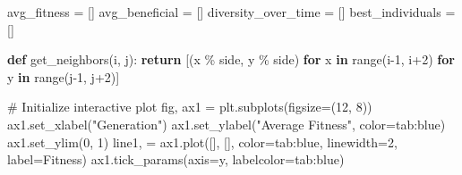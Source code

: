 \documentclass[
  letterpaper,
  DIV=11,
  numbers=noendperiod]{scrreprt}
\newenvironment{Shaded}{\begin{snugshade}}{\end{snugshade}}
\newcommand{\BuiltInTok}[1]{\textcolor[rgb]{0.00,0.23,0.31}{#1}}
\newcommand{\CommentTok}[1]{\textcolor[rgb]{0.37,0.37,0.37}{#1}}
\newcommand{\ControlFlowTok}[1]{\textcolor[rgb]{0.00,0.23,0.31}{\textbf{#1}}}
\newcommand{\DecValTok}[1]{\textcolor[rgb]{0.68,0.00,0.00}{#1}}
\newcommand{\KeywordTok}[1]{\textcolor[rgb]{0.00,0.23,0.31}{\textbf{#1}}}
\newcommand{\NormalTok}[1]{\textcolor[rgb]{0.00,0.23,0.31}{#1}}
\newcommand{\OperatorTok}[1]{\textcolor[rgb]{0.37,0.37,0.37}{#1}}
\newcommand{\StringTok}[1]{\textcolor[rgb]{0.13,0.47,0.30}{#1}}
\theoremstyle{definition}
\theoremstyle{remark}
\begin{document}
\begin{tcolorbox}
\begin{Shaded}
\begin{Highlighting}[]
\NormalTok{avg\_fitness }\OperatorTok{=}\NormalTok{ []}
\NormalTok{avg\_beneficial }\OperatorTok{=}\NormalTok{ []}
\NormalTok{diversity\_over\_time }\OperatorTok{=}\NormalTok{ []}
\NormalTok{best\_individuals }\OperatorTok{=}\NormalTok{ []}

\KeywordTok{def}\NormalTok{ get\_neighbors(i, j):}
    \ControlFlowTok{return}\NormalTok{ [(x }\OperatorTok{\%}\NormalTok{ side, y }\OperatorTok{\%}\NormalTok{ side)}
            \ControlFlowTok{for}\NormalTok{ x }\KeywordTok{in} \BuiltInTok{range}\NormalTok{(i}\OperatorTok{{-}}\DecValTok{1}\NormalTok{, i}\OperatorTok{+}\DecValTok{2}\NormalTok{)}
            \ControlFlowTok{for}\NormalTok{ y }\KeywordTok{in} \BuiltInTok{range}\NormalTok{(j}\OperatorTok{{-}}\DecValTok{1}\NormalTok{, j}\OperatorTok{+}\DecValTok{2}\NormalTok{)]}

\CommentTok{\# Initialize interactive plot}
\NormalTok{fig, ax1 }\OperatorTok{=}\NormalTok{ plt.subplots(figsize}\OperatorTok{=}\NormalTok{(}\DecValTok{12}\NormalTok{, }\DecValTok{8}\NormalTok{))}
\NormalTok{ax1.set\_xlabel(}\StringTok{"Generation"}\NormalTok{)}
\NormalTok{ax1.set\_ylabel(}\StringTok{"Average Fitness"}\NormalTok{, color}\OperatorTok{=}\StringTok{\textquotesingle{}tab:blue\textquotesingle{}}\NormalTok{)}
\NormalTok{ax1.set\_ylim(}\DecValTok{0}\NormalTok{, }\DecValTok{1}\NormalTok{)}
\NormalTok{line1, }\OperatorTok{=}\NormalTok{ ax1.plot([], [], color}\OperatorTok{=}\StringTok{\textquotesingle{}tab:blue\textquotesingle{}}\NormalTok{, linewidth}\OperatorTok{=}\DecValTok{2}\NormalTok{, label}\OperatorTok{=}\StringTok{\textquotesingle{}Fitness\textquotesingle{}}\NormalTok{)}
\NormalTok{ax1.tick\_params(axis}\OperatorTok{=}\StringTok{\textquotesingle{}y\textquotesingle{}}\NormalTok{, labelcolor}\OperatorTok{=}\StringTok{\textquotesingle{}tab:blue\textquotesingle{}}\NormalTok{)}


\end{Highlighting}
\end{Shaded}
\end{tcolorbox}
\end{document}
